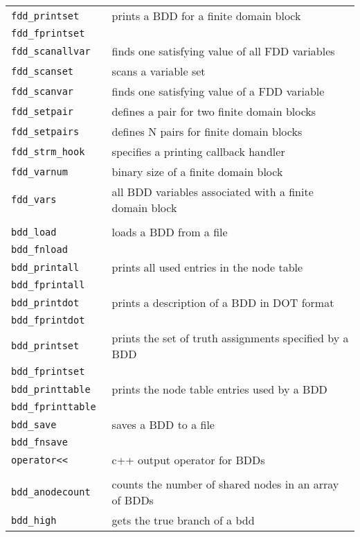 \begin{supertabular}{|l|l|}
{\tt fdd\_printset } & prints a BDD for a finite domain block  \\
{\tt fdd\_fprintset } & \\\hline
{\tt fdd\_scanallvar } & finds one satisfying value of all FDD variables  \\\hline
{\tt fdd\_scanset } & scans a variable set  \\\hline
{\tt fdd\_scanvar } & finds one satisfying value of a FDD variable  \\\hline
{\tt fdd\_setpair } & defines a pair for two finite domain blocks  \\\hline
{\tt fdd\_setpairs } & defines N pairs for finite domain blocks  \\\hline
{\tt fdd\_strm\_hook } & specifies a printing callback handler  \\\hline
{\tt fdd\_varnum } & binary size of a finite domain block  \\\hline
{\tt fdd\_vars } & all BDD variables associated with a finite domain block  \\\hline
{} \\ \hline
{\tt bdd\_load } & loads a BDD from a file  \\
{\tt bdd\_fnload } & \\\hline
{\tt bdd\_printall } & prints all used entries in the node table  \\
{\tt bdd\_fprintall } & \\\hline
{\tt bdd\_printdot } & prints a description of a BDD in DOT format  \\
{\tt bdd\_fprintdot } & \\\hline
{\tt bdd\_printset } & prints the set of truth assignments specified by a BDD  \\
{\tt bdd\_fprintset } & \\\hline
{\tt bdd\_printtable } & prints the node table entries used by a BDD  \\
{\tt bdd\_fprinttable } & \\\hline
{\tt bdd\_save } & saves a BDD to a file  \\
{\tt bdd\_fnsave } & \\\hline
{\tt operator{\tt<<} } & c++ output operator for BDDs  \\\hline
{} \\ \hline
{\tt bdd\_anodecount } & counts the number of shared nodes in an array of BDDs  \\\hline
{\tt bdd\_high } & gets the true branch of a bdd   \\\hline

\end{supertabular}
